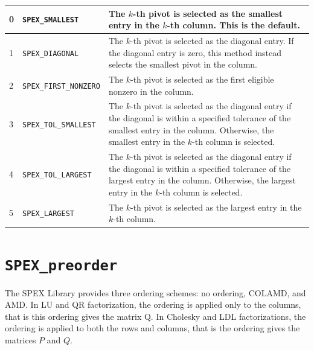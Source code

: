 \documentclass[12pt,oneside]{book}
\theoremstyle{definition}
\newenvironment{SizedCenteredTabular}[2][\small]
    {   
        #1\begin{center}\begin{tabular}{#2}
    }{ 
        \end{tabular}\end{center}
    }
\begin{document}
\begin{SizedCenteredTabular}{llp{4in}}\hline
    0 & \verb|SPEX_SMALLEST|        & The $k$-th pivot is selected as the smallest 
                                      entry in the $k$-th column.  This is the default. \\ \hline
    1 & \verb|SPEX_DIAGONAL|        & The $k$-th pivot is selected as the diagonal
                                      entry. If the diagonal entry is zero,
                                      this method instead selects the smallest
                                      pivot in the column.\\ \hline
    2 & \verb|SPEX_FIRST_NONZERO|   & The $k$-th pivot is selected as the first
                                      eligible nonzero in the column. \\ \hline
    3 & \verb|SPEX_TOL_SMALLEST|    & The $k$-th pivot is selected as the diagonal
                                      entry if the diagonal is within a
                                      specified tolerance of the smallest entry in
                                      the column. Otherwise, the smallest
                                      entry in the $k$-th column is selected. \\ \hline
    4 & \verb|SPEX_TOL_LARGEST|     & The $k$-th pivot is selected as the diagonal
                                      entry if the diagonal is within a
                                      specified tolerance of the largest entry in
                                      the column.  Otherwise, the largest
                                      entry in the $k$-th column is selected. \\ \hline
    5 & \verb|SPEX_LARGEST|         & The $k$-th pivot is selected as the largest
                                          entry in the $k$-th column. \\ \hline
\end{SizedCenteredTabular}

\section{\texttt{SPEX\_preorder}} \label{ss:SPEX_preorder}
The SPEX Library provides three ordering schemes: no ordering, COLAMD, and AMD. In LU and QR factorization, the ordering is applied only to the columns, that is this ordering gives the matrix Q. In Cholesky and LDL factorizations, the ordering is applied to both the rows and columns, that is the ordering gives the matrices $P$ and $Q$.
\end{document}
